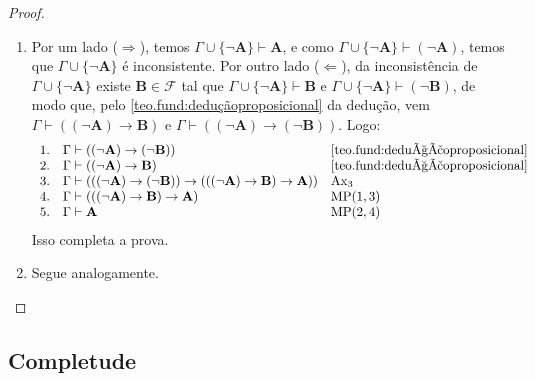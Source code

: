\begin{proof}
    \leavevmode
        \begin{enumerate}[leftmargin=*, align=left, label=\textbf{(\alph*)}]
            \item Por um lado ($\Rightarrow$), temos $\Gamma \cup \{\neg \mathbf{A}\} \vdash \mathbf{A}$, e como $\Gamma \cup \{\neg \mathbf{A}\} \vdash (\neg \mathbf{A})$, temos que  $\Gamma \cup \{\neg \mathbf{A}\}$ é inconsistente. Por outro lado ($\Leftarrow$), da inconsistência de $\Gamma \cup \{\neg \mathbf{A}\}$ existe $\mathbf{B} \in \mathcal{F}$ tal que $\Gamma \cup \{\neg \mathbf{A}\} \vdash \mathbf{B}$ e $\Gamma \cup \{\neg \mathbf{A}\} \vdash (\neg \mathbf{B})$, de modo que, pelo \cref{teo.fund:deduçãoproposicional} da dedução, vem $\Gamma \vdash ((\neg \mathbf{A}) \rightarrow \mathbf{B})$ e $\Gamma \vdash ((\neg \mathbf{A}) \rightarrow (\neg \mathbf{B}))$. Logo:
                \[
                    \begin{array}{rll}
                        1. & \Gamma \vdash ((\neg \mathbf{A}) \rightarrow (\neg \mathbf{B})) & \eqref{teo.fund:deduçãoproposicional} \\
                        2. & \Gamma \vdash ((\neg \mathbf{A}) \rightarrow \mathbf{B}) & \eqref{teo.fund:deduçãoproposicional} \\
                        3. & \Gamma \vdash ((( \neg \mathbf{A}) \rightarrow (\neg \mathbf{B})) \rightarrow ((( \neg \mathbf{A}) \rightarrow \mathbf{B}) \rightarrow \mathbf{A})) & \mathrm{Ax}_3 \\
                        4. & \Gamma \vdash ((( \neg \mathbf{A}) \rightarrow \mathbf{B}) \rightarrow \mathbf{A}) & \text{MP}(1,3) \\
                        5. & \Gamma \vdash \mathbf{A} & \text{MP}(2,4)
                    \end{array}
                \]
            Isso completa a prova. \blackproof
            \item Segue analogamente. \blackproof
        \end{enumerate}
\end{proof}

\subsection{Completude}

